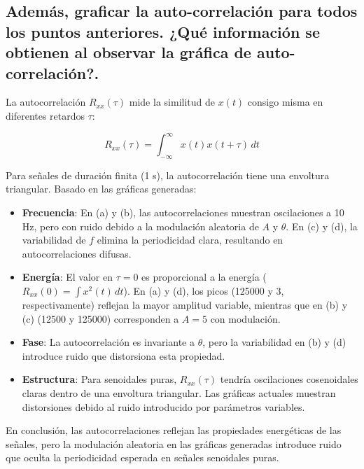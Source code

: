 \subsection*{Además, graficar la auto-correlación para todos los puntos anteriores. ¿Qué información se obtienen al observar la gráfica de auto-correlación?.}

La autocorrelación $R_{xx}(\tau)$ mide la similitud de $x(t)$ consigo misma en diferentes retardos $\tau$:

\[
R_{xx}(\tau) = \int_{-\infty}^{\infty} x(t) x(t + \tau) \, dt
\]

Para señales de duración finita (1 s), la autocorrelación tiene una envoltura triangular. Basado en las gráficas generadas:

\begin{itemize}
    \item \textbf{Frecuencia}: En (a) y (b), las autocorrelaciones muestran oscilaciones a 10 Hz, pero con ruido debido a la modulación aleatoria de $A$ y $\theta$. En (c) y (d), la variabilidad de $f$ elimina la periodicidad clara, resultando en autocorrelaciones difusas.
    \item \textbf{Energía}: El valor en $\tau=0$ es proporcional a la energía ($R_{xx}(0) = \int x^2(t) \, dt$). En (a) y (d), los picos (125000 y 3, respectivamente) reflejan la mayor amplitud variable, mientras que en (b) y (c) (12500 y 125000) corresponden a $A=5$ con modulación.
    \item \textbf{Fase}: La autocorrelación es invariante a $\theta$, pero la variabilidad en (b) y (d) introduce ruido que distorsiona esta propiedad.
    \item \textbf{Estructura}: Para senoidales puras, $R_{xx}(\tau)$ tendría oscilaciones cosenoidales claras dentro de una envoltura triangular. Las gráficas actuales muestran distorsiones debido al ruido introducido por parámetros variables.
\end{itemize}

En conclusión, las autocorrelaciones reflejan las propiedades energéticas de las señales, pero la modulación aleatoria en las gráficas generadas introduce ruido que oculta la periodicidad esperada en señales senoidales puras.